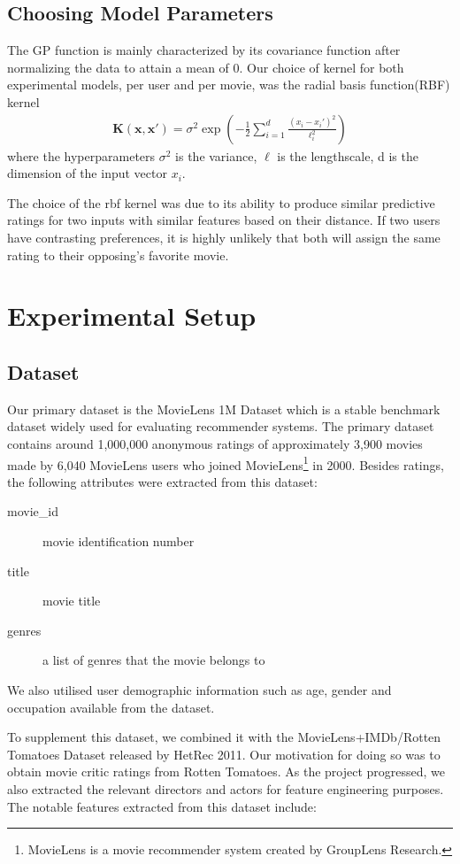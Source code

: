 \documentclass[letterpaper]{article}
\begin{document}
\subsection{Choosing Model Parameters}
The GP function is mainly characterized by its covariance function after normalizing the data to attain a mean of 0.
Our choice of kernel for both experimental models, per user and per movie, was the radial basis function(RBF) kernel
\begin{align*}
	\textbf{K} (\textbf{x},\textbf{x}') = \sigma^2\exp(-\frac{1}{2}\sum_{i=1}^{d}
	\frac{(x_{i} - x_{i}')^{2}}{\ell_{i}^{2}})
\end{align*} 
where the hyperparameters $\sigma^{2}$ is the variance, $\ell $ is the lengthscale, d is the dimension of the input vector $ x_{i}. $

The choice of the rbf kernel was due to its ability to produce similar predictive ratings for two inputs with similar features based on their distance. If two users have contrasting preferences, it is highly unlikely that both will assign the same rating to their opposing's favorite movie.

\section{Experimental Setup}
\subsection{Dataset}
Our primary dataset is the MovieLens 1M Dataset which is a stable benchmark dataset widely used for evaluating recommender systems. The primary dataset contains around 1,000,000 anonymous ratings of approximately 3,900 movies made by 6,040 MovieLens users who joined MovieLens\footnote{MovieLens is a movie recommender system created by GroupLens Research.} in 2000. Besides ratings, the following attributes were extracted from this dataset:

\begin{description}
	\item[movie\_id] movie identification number
	\item[title] movie title
	\item[genres] a list of genres that the movie belongs to
\end{description}

We also utilised user demographic information such as age, gender and occupation available from the dataset.

To supplement this dataset, we combined it with the MovieLens+IMDb/Rotten Tomatoes Dataset released by HetRec 2011. Our motivation for doing so was to obtain movie critic ratings from Rotten Tomatoes. As the project progressed, we also extracted the relevant directors and actors for feature engineering purposes. The notable features extracted from this dataset include:
\end{document}
